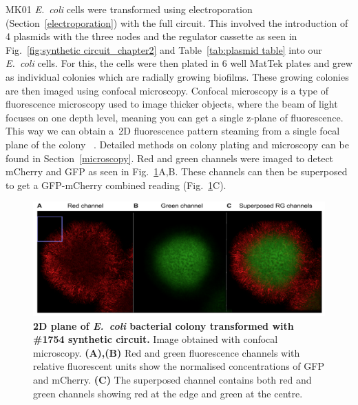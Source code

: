 MK01 \textit{E.~coli} cells were transformed using electroporation (Section~\ref{electroporation}) with the full circuit.
This involved the introduction of 4 plasmids with the three nodes and the regulator cassette as seen in Fig.~\ref{fig:synthetic circuit_chapter2} and Table~\ref{tab:plasmid table} into our \textit{E.~coli} cells.
For this, the cells were then plated in 6 well MatTek plates and grew as individual colonies which are radially growing biofilms.
These growing colonies are then imaged using confocal microscopy.
Confocal microscopy is a type of fluorescence microscopy used to image thicker objects, where the beam of light focuses on one depth level, meaning you can get a single z-plane of fluorescence.
This way we can obtain a~\acrfull{2D} fluorescence pattern steaming from a single focal plane of the colony ~\parencite{semwogerere2005confocal}.
 Detailed methods on colony plating and microscopy can be found in Section~\ref{microscopy}.
Red and green channels were imaged to detect mCherry and GFP as seen in Fig.~\ref{rgchannels}A,B.
These channels can then be superposed to get a GFP-mCherry combined reading (Fig.~\ref{rgchannels}C).
\begin{figure}[H]

    \includegraphics[width=1\textwidth]{chapters/Chapter 3/rgchannels}
    \caption{\textbf{2D plane of \textit{E.~coli} bacterial colony transformed with \#1754 synthetic circuit.} Image obtained with confocal microscopy. \textbf{(A),(B)} Red and green fluorescence channels with relative fluorescent units show the normalised concentrations of GFP and mCherry. \textbf{(C)} The superposed channel contains both red and green channels showing red at the edge and green at the centre.}
    \label{rgchannels}
\end{figure}

